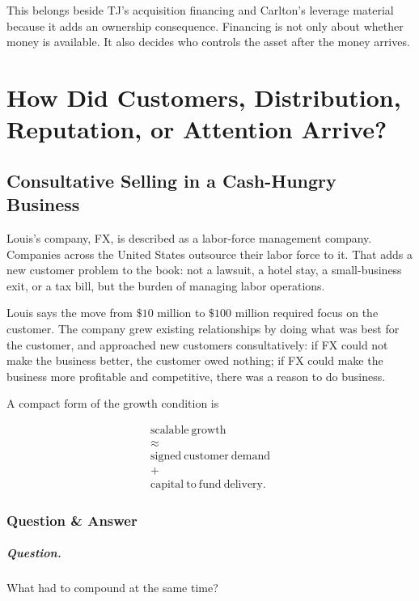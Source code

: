 \documentclass[11pt,oneside]{book}
\begin{document}
This belongs beside TJ's acquisition financing and Carlton's leverage material because it adds an ownership consequence. Financing is not only about whether money is available. It also decides who controls the asset after the money arrives.

\chapter{How Did Customers, Distribution, Reputation, or Attention Arrive?}

\section{Consultative Selling in a Cash-Hungry Business}

Louis's company, FX, is described as a labor-force management company. Companies across the United States outsource their labor force to it. That adds a new customer problem to the book: not a lawsuit, a hotel stay, a small-business exit, or a tax bill, but the burden of managing labor operations.

Louis says the move from \(\$10\) million to \(\$100\) million required focus on the customer. The company grew existing relationships by doing what was best for the customer, and approached new customers consultatively: if FX could not make the business better, the customer owed nothing; if FX could make the business more profitable and competitive, there was a reason to do business.

A compact form of the growth condition is

\begin{equation}
\begin{gathered}
\mathrm{scalable\ growth}\\
\approx\\
\mathrm{signed\ customer\ demand}\\
+\\
\mathrm{capital\ to\ fund\ delivery}.
\end{gathered}
\end{equation}

\subsection{Question \& Answer}

\paragraph{Question.}
What had to compound at the same time?
\end{document}
